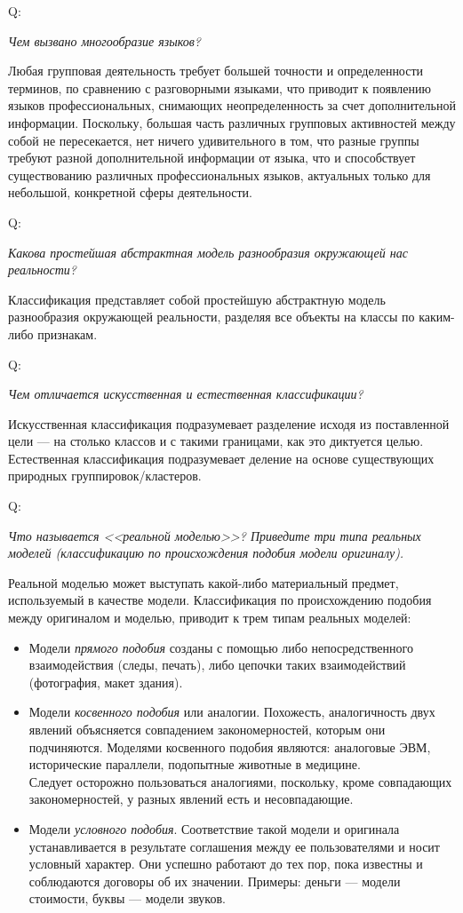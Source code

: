 \documentclass{article}
\newcommand{\note}[1]{\textit{#1}}
\newcommand{\question}[2]{
	\begin{flushright}
		Q:\hspace{2ex}\vline\hspace{2ex}
		\begin{minipage}{0.9\textwidth}
			\large
			\textit{#1}
		\end{minipage}
	\end{flushright}
	\begin{center}
		\begin{minipage}{0.95\textwidth}
			#2
		\end{minipage}
	\end{center}
	}
\begin{document}
\question{Чем вызвано многообразие языков?}{Любая групповая деятельность требует большей точности и определенности терминов, по сравнению с разговорными языками, что приводит к появлению языков профессиональных, снимающих неопределенность за счет дополнительной информации. Поскольку, большая часть различных групповых активностей между собой не пересекается, нет ничего удивительного в том, что разные группы требуют разной дополнительной информации от языка, что и способствует существованию различных профессиональных языков, актуальных только для небольшой, конкретной сферы деятельности.}
\question{Какова простейшая абстрактная модель разнообразия окружающей нас реальности?}{Классификация представляет собой простейшую абстрактную модель разнообразия окружающей реальности, разделяя все объекты на классы по каким-либо признакам.}
\question{Чем отличается искусственная и естественная классификации?}{Искусственная классификация подразумевает разделение исходя из поставленной цели --- на столько классов и с такими границами, как это диктуется целью. Естественная классификация подразумевает деление на основе существующих природных группировок/кластеров.}
\question{Что называется <<реальной моделью>>? Приведите три типа реальных моделей (классификацию по происхождения подобия модели оригиналу).}{Реальной моделью может выступать какой-либо материальный предмет, используемый в качестве модели. Классификация по происхождению подобия между оригиналом и моделью, приводит к трем типам реальных моделей:
	\begin{itemize}
		\item Модели \note{прямого подобия} созданы с помощью либо непосредственного взаимодействия (следы, печать), либо цепочки таких взаимодействий (фотография, макет здания).
		\item Модели \note{косвенного подобия} или аналогии. Похожесть, аналогичность двух явлений объясняется совпадением закономерностей, которым они подчиняются. Моделями косвенного подобия являются: аналоговые ЭВМ, исторические параллели, подопытные животные в медицине.\\Следует осторожно пользоваться аналогиями, поскольку, кроме совпадающих закономерностей, у разных явлений есть и несовпадающие.
		\item Модели \note{условного подобия}. Соответствие такой модели и оригинала устанавливается в результате соглашения между ее пользователями и носит условный характер. Они успешно работают до тех пор, пока известны и соблюдаются договоры об их значении. Примеры: деньги --- модели стоимости, буквы --- модели звуков.
	\end{itemize}}
\end{document}
